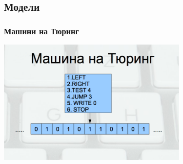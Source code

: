 \documentclass{beamer}
\begin{document}
\subsection{Модели} 


\begin{frame}[fragile]
\frametitle{Машини на Тюринг}


\begin{center}
  
\includegraphics[width=9.5cm]{images/turing}

\end{center}

\end{frame}
\end{document}
